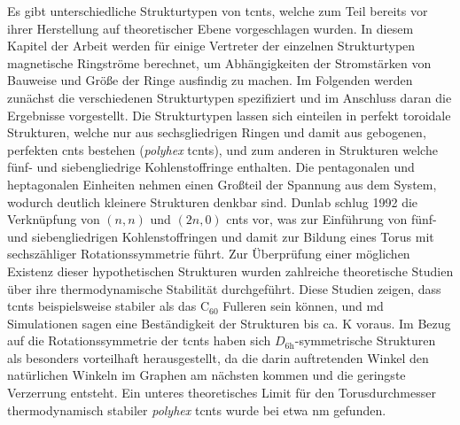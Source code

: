 Es gibt unterschiedliche Strukturtypen von \acp{tcnt}, welche zum Teil bereits vor ihrer Herstellung auf theoretischer Ebene vorgeschlagen wurden. In diesem Kapitel der Arbeit werden für einige Vertreter der einzelnen Strukturtypen magnetische Ringströme berechnet, um Abhängigkeiten der Stromstärken von Bauweise und Größe der Ringe ausfindig zu machen. Im Folgenden werden zunächst die verschiedenen Strukturtypen spezifiziert und im Anschluss daran die Ergebnisse vorgestellt.   
Die Strukturtypen lassen sich einteilen in perfekt toroidale Strukturen, welche nur aus sechsgliedrigen Ringen und damit aus gebogenen, perfekten \acp{cnt} bestehen (\textit{polyhex} \acp{tcnt}), und zum anderen in Strukturen welche fünf- und siebengliedrige Kohlenstoffringe enthalten. Die pentagonalen und heptagonalen Einheiten nehmen einen Großteil der Spannung aus dem System, wodurch deutlich kleinere Strukturen denkbar sind. Dunlab\supercite{dunlap1992connecting} schlug 1992 die Verknüpfung von $(n,n)$ und $(2n,0)$ \acp{cnt} vor, was zur Einführung von fünf- und siebengliedrigen Kohlenstoffringen und damit zur Bildung eines Torus mit sechszähliger Rotationssymmetrie führt. Zur Überprüfung einer möglichen Existenz dieser hypothetischen Strukturen wurden zahlreiche theoretische Studien über ihre thermodynamische Stabilität durchgeführt. Diese Studien zeigen, dass \acp{tcnt} beispielsweise stabiler als das C$_{60}$ Fulleren\supercite{dunlap1992connecting,itoh1993toroidal,ihara1993toroidal,itoh1993toroidal2} sein können, und \ac{md} Simulationen\supercite{itoh1993toroidal,hod2003carbon,tacsci2005stability,chen2011thermal} sagen eine Beständigkeit der Strukturen bis ca. \unit[2000]{K} voraus. Im Bezug auf die Rotationssymmetrie der \acp{tcnt} haben sich $D_{\text{6h}}$-symmetrische Strukturen als besonders vorteilhaft herausgestellt\supercite{liu2011structure,ihara1995helically}, da die darin auftretenden Winkel den natürlichen Winkeln im Graphen am nächsten kommen und die geringste Verzerrung entsteht. Ein unteres theoretisches Limit für den Torusdurchmesser thermodynamisch stabiler \textit{polyhex} \acp{tcnt} wurde bei etwa \unit[200]{nm} gefunden.\supercite{meunier1998atomic}\\

